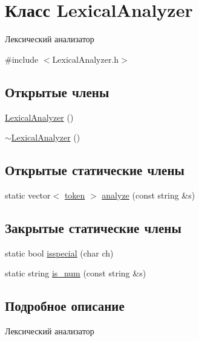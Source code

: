 \hypertarget{class_lexical_analyzer}{}\section{Класс Lexical\+Analyzer}
\label{class_lexical_analyzer}


Лексический анализатор  




{\ttfamily \#include $<$Lexical\+Analyzer.\+h$>$}

\subsection*{Открытые члены}
\begin{DoxyCompactItemize}
\item 
\hyperlink{class_lexical_analyzer_a1934aa8efdd1b1b7d31ecc245838d995}{Lexical\+Analyzer} ()
\item 
\hyperlink{class_lexical_analyzer_ac14482de40e9c91619739c8dcd6e8292}{$\sim$\+Lexical\+Analyzer} ()
\end{DoxyCompactItemize}
\subsection*{Открытые статические члены}
\begin{DoxyCompactItemize}
\item 
static vector$<$ \hyperlink{structtoken}{token} $>$ \hyperlink{class_lexical_analyzer_afd35f07227fd40638e9d145ee6413640}{analyze} (const string \&s)
\end{DoxyCompactItemize}
\subsection*{Закрытые статические члены}
\begin{DoxyCompactItemize}
\item 
static bool \hyperlink{class_lexical_analyzer_a24d338442e8205f00690565bd2157ebc}{isspecial} (char ch)
\item 
static string \hyperlink{class_lexical_analyzer_a9e124ea0dcdfccc94f17ecc99aac6206}{is\+\_\+num} (const string \&s)
\end{DoxyCompactItemize}


\subsection{Подробное описание}
Лексический анализатор 

